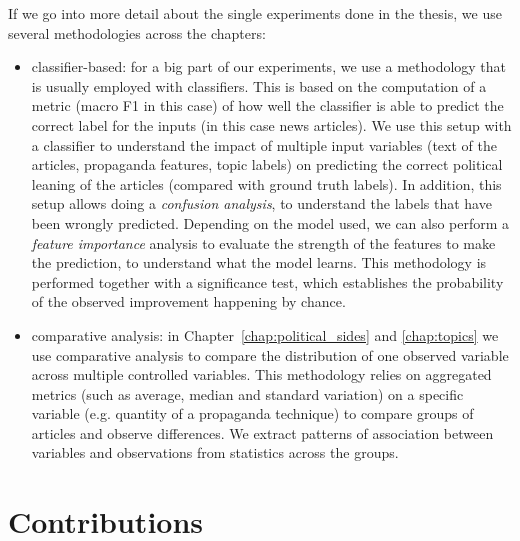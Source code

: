 If we go into more detail about the single experiments done in the thesis, we use several methodologies across the chapters:
\begin{itemize}
    \item classifier-based: for a big part of our experiments, we use a methodology that is usually employed with classifiers. This is based on the computation of a metric (macro F1 in this case) of how well the classifier is able to predict the correct label for the inputs (in this case news articles). We use this setup with a classifier to understand the impact of multiple input variables (text of the articles, propaganda features, topic labels) on predicting the correct political leaning of the articles (compared with ground truth labels). In addition, this setup allows doing a \emph{confusion analysis}, to understand the labels that have been wrongly predicted. Depending on the model used, we can also perform a \emph{feature importance} analysis to evaluate the strength of the features to make the prediction, to understand what the model learns. This methodology is performed together with a significance test, which establishes the probability of the observed improvement happening by chance.
    \item comparative analysis: in Chapter~\ref{chap:political_sides} and \ref{chap:topics} we use comparative analysis to compare the distribution of one observed variable across multiple controlled variables. This methodology relies on aggregated metrics (such as average, median and standard variation) on a specific variable (e.g. quantity of a propaganda technique) to compare groups of articles and observe differences. We extract patterns of association between variables and observations from statistics across the groups.
\end{itemize}


\section{\statusgreen Contributions}
\label{sec:intro_contributions}

